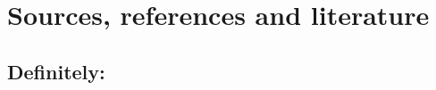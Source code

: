 \newpage
\setlength{\parindent}{0cm}
\section{Sources, references and literature}
    \subsection{Definitely:}
        \begin{itemize}
         \end{itemize}
